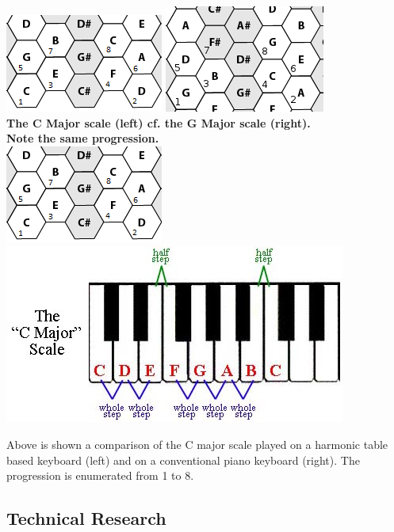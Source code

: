 \documentclass[10pt,a4paper]{article}
\begin{document}
\pagebreak
\begin{center}
\includegraphics[scale=0.7]{scale.png}
\hspace{10pt}
\includegraphics[scale=0.5]{scale3.png}\\
\textbf{The C Major scale (left) cf. the G Major scale (right). \\ Note the same progression.}\\
\includegraphics[scale=0.7]{scale.png}
\includegraphics[scale=1.5]{scale2.jpg}
\end{center}
Above is shown a comparison of the C major scale played on a harmonic table based keyboard (left) and on a conventional piano keyboard (right). The progression is enumerated from 1 to 8.\\

\subsection{Technical Research}
\end{document}
